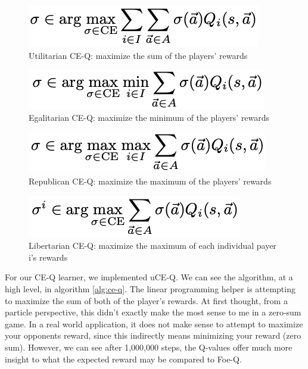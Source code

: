 \documentclass[conference]{IEEEtran}
\begin{document}
\begin{figure}[]
    \centering
    \includegraphics[scale=0.45]{figs/uCE-Q}
    \caption{Utilitarian CE-Q: maximize the sum of the players' rewards}
    \label{fig:uce-q}
\end{figure}

\begin{figure}[]
    \centering
    \includegraphics[scale=0.45]{figs/eCE-Q}
    \caption{Egalitarian CE-Q: maximize the minimum of the players' rewards}
    \label{fig:ece-q}
\end{figure}

\begin{figure}[]
    \centering
    \includegraphics[scale=0.45]{figs/rCE-Q}
    \caption{Republican CE-Q: maximize the maximum of the players' rewards}
    \label{fig:rce-q}
\end{figure}

\begin{figure}[]
    \centering
    \includegraphics[scale=0.45]{figs/lCE-Q}
    \caption{Libertarian CE-Q: maximize the maximum of each individual payer i's rewards}
    \label{fig:lce-q}
\end{figure}

For our CE-Q learner, we implemented uCE-Q. We can see the algorithm, at a high level, in algorithm \ref{alg:ce-q}. The linear programming helper is attempting to maximize the sum of both of the player's rewards. At first thought, from a particle perspective, this didn't exactly make the most sense to me in a zero-sum game. In a real world application, it does not make sense to attempt to maximize your opponents reward, since this indirectly means minimizing your reward (zero sum). However, we can see after 1,000,000 steps, the Q-values offer much more insight to what the expected reward may be compared to Foe-Q.
\end{document}
